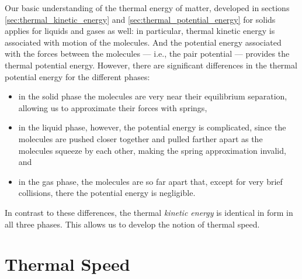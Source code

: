 Our basic understanding of the thermal energy of matter, developed
in sections \ref{sec:thermal_kinetic_energy} and
\ref{sec:thermal_potential_energy} for solids 
applies for liquids and gases as well: in particular, 
thermal kinetic energy is associated with motion of the molecules.
And the potential energy associated with
the forces between the molecules --- i.e., the pair potential ---
provides the thermal potential energy.
However, there are significant differences in the thermal
potential energy for the different phases:
\begin{itemize}
\item in the solid phase the molecules are very near their equilibrium
  separation, allowing us to approximate their forces with springs,
\item in the liquid phase, however, the potential energy is
  complicated, since the molecules are pushed closer together and
  pulled farther apart as the molecules squeeze by each other, making
  the spring approximation invalid, and
\item in the gas phase, the molecules are so far apart that, except for
  very brief collisions, there the potential energy is negligible.
\end{itemize}

In contrast to these differences, the thermal \textit{kinetic energy}
is identical in form in all three phases.  This allows us to develop the
notion of thermal speed.

\section{Thermal Speed}

